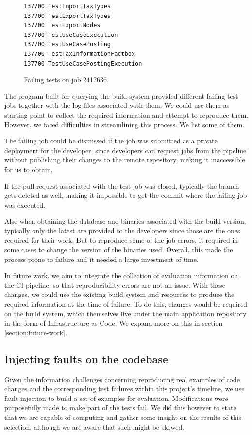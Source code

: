 \documentclass{article}
\begin{document}
\begin{figure}[H]
\begin{verbatim}
137700 TestImportTaxTypes
137700 TestExportTaxTypes
137700 TestExportNodes
137700 TestUseCaseExecution
137700 TestUseCasePosting
137700 TestTaxInformationFactbox
137700 TestUseCasePostingExecution
\end{verbatim}
\caption{Failing tests on job 2412636.}
\label{fig:evalfailures}
\end{figure}

The program built for querying the build system provided different failing test jobs together with the log files associated with them. We could use them as starting point to collect the required information and attempt to reproduce them. However, we faced difficulties in streamlining this process. We list some of them.

The failing job could be dismissed if the job was submitted as a private deployment for the developer, since developers can request jobs from the pipeline without publishing their changes to the remote repository, making it inaccessible for us to obtain.

If the pull request associated with the test job was closed, typically the branch gets deleted as well, making it impossible to get the commit where the failing job was executed.

Also when obtaining the database and binaries associated with the build version, typically only the latest are provided to the developers since those are the ones required for their work. But to reproduce some of the job errors, it required in some cases to change the version of the binaries used. Overall, this made the process prone to failure and it needed a large investment of time.

In future work, we aim to integrate the collection of evaluation information on the CI pipeline, so that reproducibility errors are not an issue. With these changes, we could use the existing build system and resources to produce the required information at the time of failure. To do this, changes would be required on the build system, which themselves live under the main application repository in the form of Infrastructure-as-Code. We expand more on this in section \ref{section:future-work}.

\subsection{Injecting faults on the codebase}
Given the information challenges concerning reproducing real examples of code changes and the corresponding test failures within this project's timeline, we use fault injection to build a set of examples for evaluation. Modifications were purposefully made to make part of the tests fail. We did this however to state that we are capable of computing and gather some insight on the results of this selection, although we are aware that such might be skewed.
\end{document}
